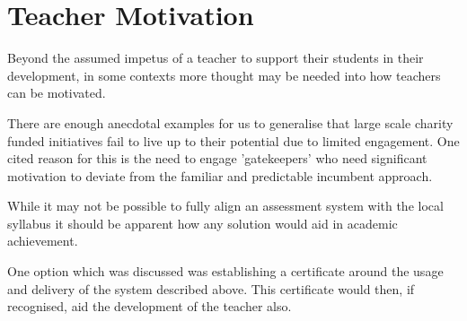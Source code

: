 \section{Teacher Motivation}

Beyond the assumed impetus of a teacher to support their students in their 
development, in some contexts more thought may be needed into how teachers 
can be motivated.

There are enough anecdotal examples for us to generalise that large scale 
charity funded initiatives fail to live up to their potential due to limited
engagement. One cited reason for this is the need to engage 'gatekeepers' who
need significant motivation to deviate from the familiar and predictable 
incumbent approach. 

While it may not be possible to fully align an assessment system with the local
syllabus it should be apparent how any solution would aid in academic 
achievement. 

One option which was discussed was establishing a certificate around the usage and delivery of the system described above. This certificate would then, if 
recognised, aid the development of the teacher also.


